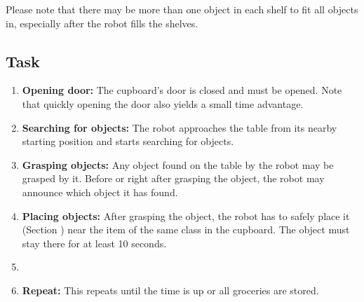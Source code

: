 Please note that there may be more than one object in each shelf to fit all objects in, especially after the robot fills the shelves. 

\subsection{Task}
\begin{enumerate}
\item \textbf{Opening door:} The cupboard's door is closed and must be opened. Note that quickly opening the door also yields a small time advantage. 
\item \textbf{Searching for objects:} The robot approaches the table from its nearby starting position and starts searching for objects. 
\item \textbf{Grasping objects:} Any object found on the table by the robot may be grasped by it. 
  Before or right after grasping the object, the robot may announce which object it has found. 
\item \textbf{Placing objects:} After grasping the object, the robot has to safely place it (Section ) near the item of the same class in the cupboard. 
  The object must stay there for at least 10 seconds.
\item 
\item \textbf{Repeat:} This repeats until the time is up or all groceries are stored. 
\end{enumerate}

